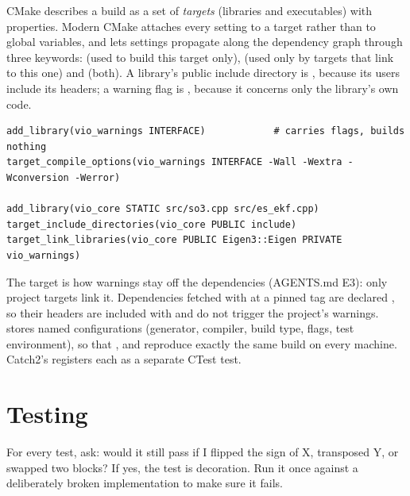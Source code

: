 CMake describes a build as a set of \emph{targets} (libraries and executables) with properties. Modern CMake attaches every setting to a target
rather than to global variables, and lets settings propagate along the dependency graph through three keywords:
 (used to build this target only),  (used only by targets that link to this one) and  (both). A library's public
include directory is , because its users include its headers; a warning flag is , because it concerns only the library's
own code.

\begin{lstlisting}
add_library(vio_warnings INTERFACE)            # carries flags, builds nothing
target_compile_options(vio_warnings INTERFACE -Wall -Wextra -Wconversion -Werror)

add_library(vio_core STATIC src/so3.cpp src/es_ekf.cpp)
target_include_directories(vio_core PUBLIC include)
target_link_libraries(vio_core PUBLIC Eigen3::Eigen PRIVATE vio_warnings)
\end{lstlisting}

The  target is how warnings stay off the dependencies (AGENTS.md E3): only project targets link it. Dependencies fetched with
 at a pinned tag are declared , so their headers are included with  and do not trigger the project's warnings.
 stores named configurations (generator, compiler, build type, flags, test environment), so that
,  and  reproduce exactly the same build
on every machine. Catch2's  registers each  as a separate CTest test.

\section{Testing}

\begin{keyidea}
For every test, ask: would it still pass if I flipped the sign of X, transposed Y, or swapped two blocks? If yes, the test is
decoration. Run it once against a deliberately broken implementation to make sure it fails.
\end{keyidea}

